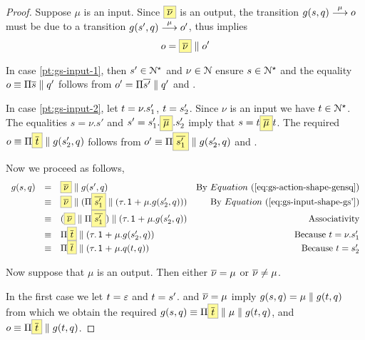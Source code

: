 \begin{proof}
  Suppose $\mu$ is an input. Since $ \out{\nu}$ is an output, the transition
  $g(s, q) \mathrel{\overset{ \mu }\longrightarrow} o$ must be due to a transition $g(s', q) \mathrel{\overset{\mu}\longrightarrow} o'$,
  thus  implies
  \begin{equation}
    \label{eq:gs-input-shape-o}
    o = \out{\nu} \Par o'
  \end{equation}


  In case \ref{pt:gs-input-1},
 then $s' \in \mathcal{N}^\star$ and $\nu \in \mathcal{N}$
  ensure $s \in \mathcal{N}^\star$ and the equality
  $o \equiv \Pi \overline{s} \mathrel{\parallel} q'$ follows from $ o' = \Pi \overline{s'} \mathrel{\parallel} q' $
  and .

  In case \ref{pt:gs-input-2}, let $t = \nu.s'_1 $, $t = s'_2$.
  Since $\nu$ is an input we have $ t \in \mathcal{N}^{\star}$.
  The equalities $s = \nu.s'$  and $ s' =  s'_1 . \out{\mu} . s'_2$
  imply that $s = \traceA \out{\mu} \traceB$.
  The required $ o \equiv \Pi \out{\traceA} \Par g(s'_2,q)$
  follows from $o' \equiv \Pi \out{s'_1} \Par g(s'_2,q)$ and
  .


  Now we proceed as follows,
  $$
  \begin{array}{lllr}
    \gen{s}{q} & = & \out{\nu} \Par \gen{s'}{q} &\text{By }\req{gs-action-shape-gensq} \\
    & \equiv & \out{\nu} \Par (\Pi \out{s'_1} \Par (\tau.\Unit \extc \mu.g(s'_2,q)))&\text{By } \req{gs-input-shape-gs'} \\
    & \equiv &
    (\out{\nu} \Par \Pi \out{s'_1}) \Par (\tau.\Unit \extc \mu.g(s'_2,q))
    & \text{Associativity}\\
    & \equiv & \Pi \out{\traceA} \Par (\tau.\Unit \extc \mu.g(s'_2,q)) & \text{Because } \traceA = \nu.s'_1 \\
    & \equiv & \Pi \out{\traceA} \Par (\tau.\Unit \extc \mu.q(\traceB,q)) & \text{Because } \traceB = s'_2 \\
  \end{array}
  $$

  Now suppose that $\mu$ is an output.
  Then either $\overline{\nu} = \mu$ or $\overline{\nu} \neq \mu$.

  In the first case we let $t = \varepsilon$ and $t = s'$.
   and $ \overline{\nu} = \mu $ imply
  $g(s, q) = \mu \mathrel{\parallel} g(t, q)$ from which we obtain the required
  $\gen{s}{q} \equiv \Pi \out{\traceA} \Par \mu \Par \gen{\traceB}{q} $,
  and $o \equiv  \Pi \out{\traceA} \Par \gen{\traceB}{q}$.



\end{proof}
